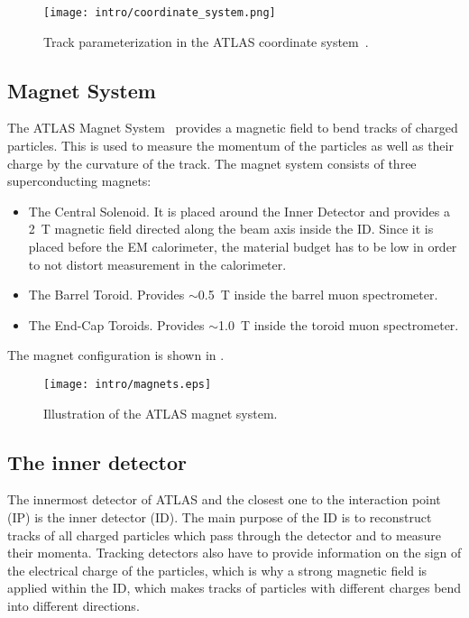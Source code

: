 \begin{figure}[]
  \centering
\texttt{[image: intro/coordinate\_system.png]}
\caption{Track parameterization in the ATLAS coordinate system~\cite{Cornelissen:2007aca}.}
\label{fig:coordinate_system}
\end{figure}

\subsection{Magnet System}
The ATLAS Magnet System~\cite{tdr_magnet} provides a magnetic field to bend tracks of charged particles. This is used to measure the momentum of the particles as well as their charge by the curvature of the track.
The magnet system consists of three superconducting magnets:
\begin{itemize}
 \item The Central Solenoid. It is placed around the Inner Detector and provides a 2~T magnetic field directed along the beam axis inside the ID. 
 Since it is placed before the EM calorimeter, the material budget has to be low 
 in order to not distort measurement in the calorimeter.
 \item The Barrel Toroid. Provides $\sim$0.5~T inside the barrel muon spectrometer.
 \item The End-Cap Toroids. Provides $\sim$1.0~T inside the toroid muon spectrometer.
\end{itemize}
The magnet configuration is shown in .

\begin{figure}[]
  \centering
\texttt{[image: intro/magnets.eps]}
\caption{Illustration of the ATLAS magnet system.}
\label{fig:atlas_magnets}
\end{figure}

\subsection{The inner detector}
\label{sec:ID}

The innermost detector of ATLAS and the closest one to the interaction point (IP) is the inner detector (ID).
The main purpose of the ID is to reconstruct tracks of all charged particles which pass through the detector and to measure their momenta.
Tracking detectors also have to provide information on the sign of the electrical charge of the particles, 
which is why a strong magnetic field is applied within the ID, 
which makes tracks of particles with different charges bend into different directions.

